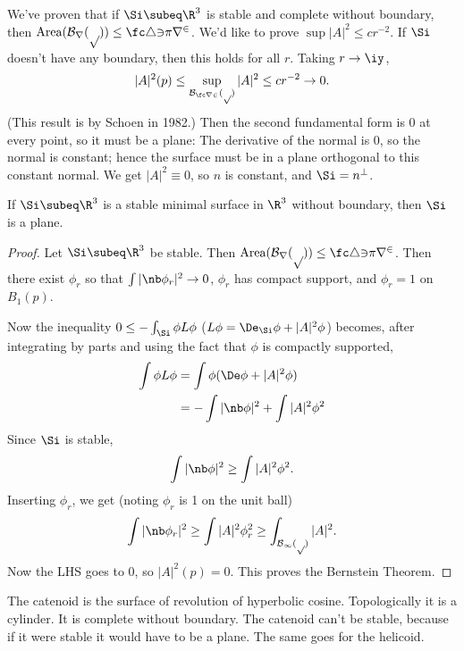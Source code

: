 
We've proven that if $\Si\subeq \R^3$ is stable and complete without boundary, then $\text{Area}(\cal B_r(p))\le \fc 43 \pi r^2$. We'd like to prove $\sup |A|^2\le cr^{-2}$. 
If $\Si$ doesn't have any boundary, then this holds for all $r$. Taking $r\to \iy$, 
\[
|A|^2(p)\le \sup_{\cal B_{\fc r2}(p)} |A|^2\le cr^{-2}\to 0.
\]
(This result is by Schoen in 1982.)
Then the second fundamental form is 0 at every point, so it must be a plane:
The derivative of the normal is 0, so the normal is constant; hence the surface must be in a plane orthogonal to this constant normal.
We get $|A|^2\equiv 0$, so $n$ is constant, and $\Si=n^{\perp}$.

\begin{thm}
If $\Si\subeq \R^3$ is a stable minimal surface in $\R^3$ without boundary, then $\Si$ is a plane.
\end{thm}
\begin{proof}
Let $\Si\subeq \R^3$ be stable. Then $\text{Area}(\cal B_r(p))\le \fc 43 \pi r^2$. Then there exist $\phi_r$ so that $\int |\nb \phi_r|^2\to 0$, $\phi_r$ has compact support, and $\phi_r=1$ on $B_1(p)$.

Now the inequality $0\le -\int_{\Si}\phi L\phi$ ($L\phi=\De_{\Si} \phi+|A|^2\phi$) becomes, after integrating by parts and using the fact that $\phi$ is compactly supported,
\begin{align*}
\int \phi L\phi &=\int \phi(\De\phi+|A|^2 \phi)\\
&=-\int|\nb \phi|^2+\int |A|^2\phi^2
\end{align*}
Since $\Si$ is stable,
\[
\int|\nb \phi|^2\ge \int|A|^2\phi^2.
\]
Inserting $\phi_r$, we get (noting $\phi_r$ is 1 on the unit ball)
\[
\int |\nb \phi_r|^2\ge \int|A|^2\phi_r^2\ge \int_{\cal B_1(p)}|A|^2.
\]
Now the LHS goes to 0, so $|A|^2(p)=0$. This proves the Bernstein Theorem.
\end{proof}
The catenoid is the surface of revolution of hyperbolic cosine. Topologically it is a cylinder. It is complete without boundary. The catenoid can't be stable, because if it were stable it would have to be a plane. The same goes for the helicoid.

